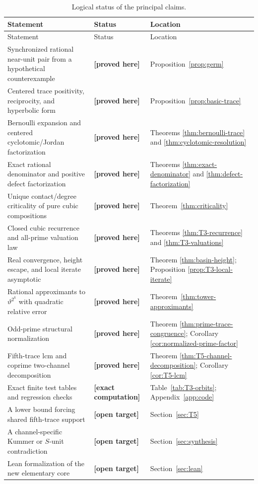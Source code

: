 \documentclass[11pt,oneside]{article}
\theoremstyle{definition}
\theoremstyle{remark}
\newcommand{\thetaAE}{\vartheta}
\newcommand{\statusproved}{\textcolor{proofgreen}{\textbf{[proved here]}}}
\newcommand{\statuscomputed}{\textcolor{computeviolet}{\textbf{[exact computation]}}}
\newcommand{\statusopen}{\textcolor{openblue}{\textbf{[open target]}}}
\begin{document}
\begin{longtable}{@{}>{\raggedright\arraybackslash}p{}>{\raggedright\arraybackslash}p{}>{\raggedright\arraybackslash}p{}@{}}
\caption{Logical status of the principal claims.}\label{tab:status}\\
\toprule
Statement & Status & Location\\
\midrule
\endfirsthead
\toprule
Statement & Status & Location\\
\midrule
\endhead
Synchronized rational near-unit pair from a hypothetical counterexample
&\statusproved&Proposition~\ref{prop:germ}\\
Centered trace positivity, reciprocity, and hyperbolic form
&\statusproved&Proposition~\ref{prop:basic-trace}\\
Bernoulli expansion and centered cyclotomic/Jordan factorization
&\statusproved&Theorems \ref{thm:bernoulli-trace} and \ref{thm:cyclotomic-resolution}\\
Exact rational denominator and positive defect factorization
&\statusproved&Theorems \ref{thm:exact-denominator} and \ref{thm:defect-factorization}\\
Unique contact/degree criticality of pure cubic compositions
&\statusproved&Theorem~\ref{thm:criticality}\\
Closed cubic recurrence and all-prime valuation law
&\statusproved&Theorems \ref{thm:T3-recurrence} and \ref{thm:T3-valuations}\\
Real convergence, height escape, and local iterate asymptotic
&\statusproved&Theorem \ref{thm:basin-height}; Proposition \ref{prop:T3-local-iterate}\\
Rational approximants to \(\thetaAE^{2^k}\) with quadratic relative error
&\statusproved&Theorem~\ref{thm:tower-approximants}\\
Odd-prime structural normalization
&\statusproved&Theorem \ref{thm:prime-trace-congruence}; Corollary \ref{cor:normalized-prime-factor}\\
Fifth-trace lcm and coprime two-channel decomposition
&\statusproved&Theorem \ref{thm:T5-channel-decomposition}; Corollary \ref{cor:T5-lcm}\\
Exact finite test tables and regression checks
&\statuscomputed&Table~\ref{tab:T3-orbits}; Appendix~\ref{app:code}\\
A lower bound forcing shared fifth-trace support
&\statusopen&Section~\ref{sec:T5}\\
A channel-specific Kummer or \(S\)-unit contradiction
&\statusopen&Section~\ref{sec:synthesis}\\
Lean formalization of the new elementary core
&\statusopen&Section~\ref{sec:lean}\\
\bottomrule
\end{longtable}
\end{document}
